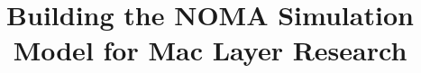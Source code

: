 \documentclass[conference,a4paper]{IEEEtran}
\begin{document}
\title{Building the NOMA Simulation Model for Mac Layer Research}

\author{
\\
}
\maketitle

%










%
%
\end{document}
